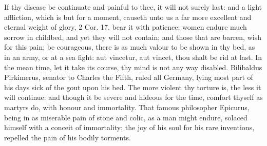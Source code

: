 {If thy disease be continuate and painful to thee, it will not surely
last: and a light affliction, which is but for a moment, causeth unto
us a far more excellent and eternal weight of glory, 2 Cor.  17.
bear it with patience; women endure much sorrow in childbed, and yet
they will not contain; and those that are barren, wish for this pain;
be courageous, there is as much valour to be shown in thy bed, as
in an army, or at a sea fight: aut vincetur, aut vincet, thou shalt be
rid at last. In the mean time, let it take its course, thy mind is not
any way disabled. Bilibaldus Pirkimerus, senator to Charles the Fifth,
ruled all Germany, lying most part of his days sick of the gout upon
his bed. The more violent thy torture is, the less it will continue:
and though it be severe and hideous for the time, comfort thyself as
martyrs do, with honour and immortality. That famous philosopher
Epicurus, being in as miserable pain of stone and colic, as a man might
endure, solaced himself with a conceit of immortality; the joy of his
soul for his rare inventions, repelled the pain of his bodily torments.

}
